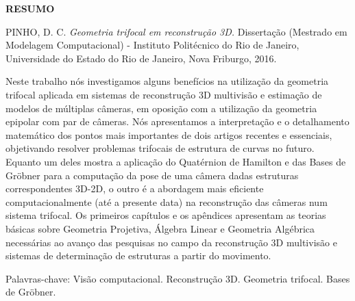 \begin{center}
{\bf RESUMO}
\end{center}

\vspace{1 cm}

\begin{center}
\begin{minipage}{1\textwidth}
\noindent PINHO, D. C. {\it Geometria trifocal em reconstrução 3D.} Dissertação (Mestrado em Modelagem Computacional) - Instituto Politécnico do Rio de Janeiro, Universidade do Estado do Rio de Janeiro, Nova Friburgo, 2016.
\end{minipage}
\end{center}

\vspace{1 cm}

\begin{center}
\begin{minipage}{1\textwidth}
\qquad Neste trabalho nós investigamos alguns benefícios na utilização da geometria trifocal aplicada em sistemas de reconstrução 3D multivisão e estimação de modelos de múltiplas câmeras, em oposição com a utilização da geometria epipolar com par de câmeras. Nós apresentamos a interpretação e o detalhamento matemático dos pontos mais importantes de dois artigos recentes e essenciais, objetivando resolver problemas trifocais de estrutura de curvas no futuro. Equanto um deles mostra a aplicação do Quatérnion de Hamilton e das Bases de Gr\"obner para a computação da pose de uma câmera dadas estruturas correspondentes 3D-2D, o outro é a abordagem mais eficiente computacionalmente (até a presente data) na reconstrução das câmeras num sistema trifocal. Os primeiros capítulos e os apêndices apresentam as teorias básicas sobre Geometria Projetiva, Álgebra Linear e Geometria Algébrica necessárias ao avanço das pesquisas no campo da reconstrução 3D multivisão e sistemas de determinação de estruturas a partir do movimento.
\end{minipage}
\end{center}
 
\vspace{1 cm}

\begin{flushleft}
Palavras-chave: Visão computacional. Reconstrução 3D. Geometria trifocal. Bases de Gr\"obner. 
\end{flushleft}

\newpage